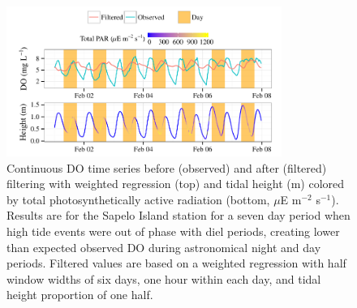 \documentclass[letterpaper,12pt,oneside]{article}\usepackage[]{graphicx}\usepackage[]{color}
\newenvironment{knitrout}{}{} %
\begin{document}
\centering\vspace*{\fill}
\begin{knitrout}
\color{fgcolor}\begin{figure}[!ht]


{\centering \includegraphics[width=0.8\textwidth]{figure/phase_out} 

}

\caption[Continuous \ac{DO} time series before (observed) and after (filtered) filtering with weighted regression (top) and tidal height (m) colored by total photosynthetically active radiation (bottom, $\mu$E m$^{-2}$ s$^{-1}$)]{Continuous \ac{DO} time series before (observed) and after (filtered) filtering with weighted regression (top) and tidal height (m) colored by total photosynthetically active radiation (bottom, $\mu$E m$^{-2}$ s$^{-1}$). Results are for the Sapelo Island station for a seven day period when high tide events were out of phase with diel periods, creating lower than expected observed \ac{DO} during astronomical night and day periods. Filtered values are based on a weighted regression with half window widths of six days, one hour within each day, and tidal height proportion of one half.\label{fig:phase_out}}
\end{figure}


\end{knitrout}
\vfill
\clearpage
\end{document}
